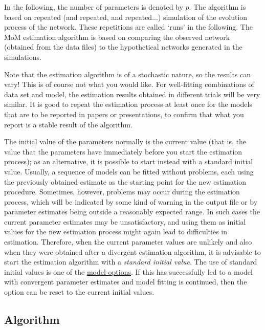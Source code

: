 \documentclass[a4paper,fleqn]{article}
\newcommand{\+}{\, + \,}
\begin{document}
{In the following, the number of
parameters is denoted by $p$. The algorithm %
is based on repeated
(and repeated, and repeated...) simulation of the evolution
process of the network. These repetitions are called `runs' in the
following. The MoM estimation algorithm is based on comparing the
observed network (obtained from the data files)
to the hypothetical networks generated in the simulations.

Note that the estimation algorithm is of a stochastic nature, so
the results can vary! This is of course not what you would like.
For well-fitting combinations of data set and model, the
estimation results obtained in different trials will be very
similar. It is good to repeat the estimation process at least once
for the models that are to be reported in papers or presentations,
to confirm that what you report is a stable result of the
algorithm.

The initial value of the parameters normally is the current value (that is,
the value that the parameters have immediately before you start
the estimation process);
as an alternative, it is possible to start instead with
a standard initial value.
Usually, a sequence of models can be
fitted without problems, each using the previously obtained estimate
as the starting point for the new estimation procedure.
Sometimes, however,
problems may occur during the estimation process, which will
be indicated by some kind of warning in the output file
or by parameter estimates being outside a reasonably expected range.
In such cases the current parameter estimates may be
unsatisfactory, and using them as initial
values for the new estimation process might again lead to
difficulties in estimation. Therefore,
when the current parameter values are unlikely and also
when they were obtained after a divergent estimation algorithm,
it is advisable to start the estimation algorithm
with a \emph{standard initial value}.
The use of standard initial values is one of the
\hyperlink{T_S_options}{model options}.
If this has successfully led to a model with convergent
parameter estimates and model fitting is continued,
then the option can be reset to the
current initial values.

\begin{screen}
\newpage
\end{screen}
\subsection{\label{algorithm}Algorithm} %

}
\end{document}
